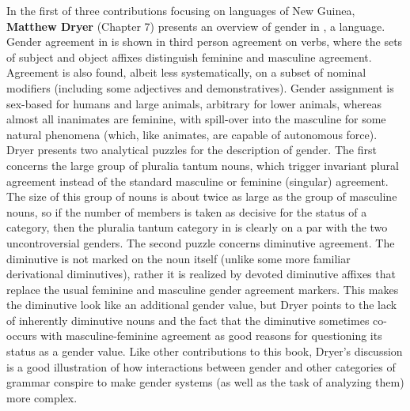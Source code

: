 \documentclass[output=collectionpaper]{langsci/langscibook}
\begin{document}
In the first of three contributions focusing on languages of New Guinea, \textbf{Matthew Dryer} (Chapter 7) presents an overview of gender in , a  language. Gender agreement in  is shown in third person agreement on verbs, where the sets of subject and object affixes distinguish feminine and masculine agreement. Agreement is also found, albeit less systematically, on a subset of nominal modifiers (including some adjectives and demonstratives). Gender assignment is sex-based for humans and large animals, arbitrary for lower animals, whereas almost all inanimates are feminine, with spill-over into the masculine for some natural phenomena (which, like animates, are capable of autonomous force). Dryer presents two analytical puzzles for the description of  gender. The first concerns the large group of pluralia tantum nouns, which trigger invariant plural agreement instead of the standard masculine or feminine (singular) agreement. The size of this group of nouns is about twice as large as the group of masculine nouns, so if the number of members is taken as decisive for the status of a category, then the pluralia tantum category in  is clearly on a par with the two uncontroversial genders. The second puzzle concerns diminutive agreement. The  diminutive is not marked on the noun itself (unlike some more familiar derivational diminutives), rather it is realized by devoted diminutive affixes that replace the usual feminine and masculine gender agreement markers. This makes the diminutive look like an additional gender value, but Dryer points to the lack of inherently diminutive nouns and the fact that the diminutive sometimes co-occurs with masculine-feminine agreement as good reasons for questioning its status as a gender value. Like other contributions to this book, Dryer’s discussion is a good illustration of how interactions between gender and other categories of grammar conspire to make gender systems (as well as the task of analyzing them) more complex.
\end{document}
